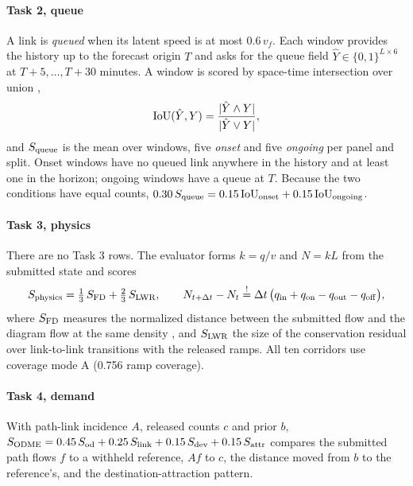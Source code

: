\paragraph{Task 2, queue} A link is \emph{queued} when its latent speed is at most $0.6\,v_f$. Each window provides
the history up to the forecast origin $T$ and asks for the queue field $\hat Y\in\{0,1\}^{L\times 6}$ at
$T{+}5,\dots,T{+}30$ minutes. A window is scored by space-time intersection over union \cite{jaccard1912},
\begin{equation}
  \mathrm{IoU}(\hat Y, Y) = \frac{|\hat Y \wedge Y|}{|\hat Y \vee Y|},
  \label{eq:iou}
\end{equation}
and $S_{\mathrm{queue}}$ is the mean over windows, five \emph{onset} and five \emph{ongoing} per panel and split. Onset windows
have no queued link anywhere in the history and at least one in the horizon; ongoing windows have a queue at $T$.
Because the two conditions have equal counts, $0.30\,S_{\mathrm{queue}} = 0.15\,\mathrm{IoU}_{\mathrm{onset}} + 0.15\,\mathrm{IoU}_{\mathrm{ongoing}}$.

\paragraph{Task 3, physics} There are no Task 3 rows. The evaluator forms $k=q/v$ and $N=kL$ from the submitted state
and scores
\begin{equation}
  S_{\mathrm{physics}} = \tfrac13\,S_{\mathrm{FD}} + \tfrac23\,S_{\mathrm{LWR}},
  \qquad
  N_{t+\Delta t}-N_t \overset{!}{=} \Delta t\,\big(q_{\mathrm{in}} + q_{\mathrm{on}} - q_{\mathrm{out}} - q_{\mathrm{off}}\big),
  \label{eq:phys}
\end{equation}
where $S_{\mathrm{FD}}$ measures the normalized distance between the submitted flow and the diagram flow at the same density
\cite{lighthill1955,richards1956}, and $S_{\mathrm{LWR}}$ the size of the conservation residual over link-to-link transitions
with the released ramps. All ten corridors use coverage mode A (0.756 ramp coverage).

\paragraph{Task 4, demand} With path-link incidence $A$, released counts $c$ and prior $b$,
$S_{\mathrm{ODME}} = 0.45\,S_{\mathrm{od}} + 0.25\,S_{\mathrm{link}} + 0.15\,S_{\mathrm{dev}} + 0.15\,S_{\mathrm{attr}}$ compares
the submitted path flows $f$ to a withheld reference, $Af$ to $c$, the distance moved from $b$ to the reference's,
and the destination-attraction pattern.

